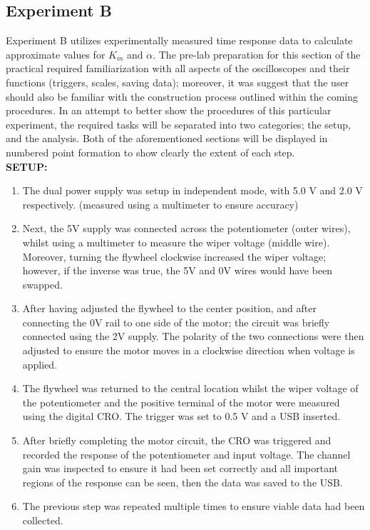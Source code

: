 \documentclass[11pt,a4paper]{article}
\begin{document}
\subsection{Experiment B}
Experiment B utilizes experimentally measured time response data to calculate approximate values for $K_m$ and $\alpha$. The pre-lab preparation for this section of the practical required familiarization with all aspects of the oscilloscopes and their functions (triggers, scales, saving data); moreover, it was suggest that the user should also be familiar with the construction process outlined within the coming procedures.
In an attempt to better show the procedures of this particular experiment, the required tasks will be separated into two categories; the setup, and the analysis. Both of the aforementioned sections will be displayed in numbered point formation to show clearly the extent of each step.\\

\textbf{SETUP:}
\begin{enumerate}
  \item The dual power supply was setup in independent mode, with 5.0 V and 2.0 V respectively. (measured using a multimeter to ensure accuracy)
  \item Next, the 5V supply was connected across the potentiometer (outer wires), whilst using a multimeter to measure the wiper voltage (middle wire). Moreover, turning the flywheel clockwise increased the wiper voltage; however, if the inverse was true, the 5V and 0V wires would have been swapped.
  \item After having adjusted the flywheel to the center position, and after connecting the 0V rail to one side of the motor; the circuit was briefly connected using the 2V supply. The polarity of the two connections were then adjusted to ensure the motor moves in a clockwise direction when voltage is applied. 
  \item The flywheel was returned to the central location whilst the wiper voltage of the potentiometer and the positive terminal of the motor were measured using the digital CRO. The trigger was set to 0.5 V and a USB inserted. 
  \item After briefly completing the motor circuit, the CRO was triggered and recorded the response of the potentiometer and input voltage. The channel gain was inspected to ensure it had been set correctly and all important regions of the response can be seen, then the data was saved to the USB.
  \item The previous step was repeated multiple times to ensure viable data had been collected. \\
\end{enumerate} 
\end{document}
